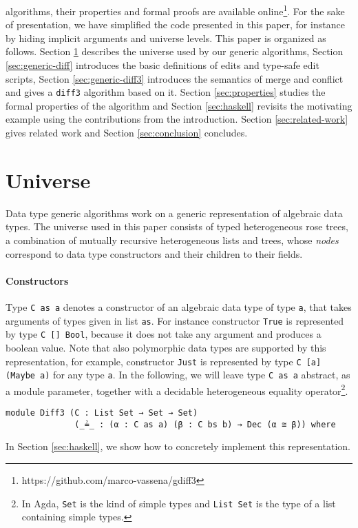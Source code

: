 \documentclass{sigplanconf}
\theoremstyle{plain}
\begin{document}
algorithms, their properties and formal proofs are available
online\footnote{https://github.com/marco-vassena/gdiff3}.  For the
sake of presentation, we have simplified the code presented in this
paper, for instance by hiding implicit arguments and universe levels.
%
This paper is organized as follows.
%
Section \ref{section:universe} describes the universe used by our
generic algorithms, Section \ref{sec:generic-diff} introduces the
basic definitions of edits and type-safe edit scripts, Section
\ref{sec:generic-diff3} introduces the semantics of merge and conflict
and gives a \texttt{diff3} algorithm based on it. Section
\ref{sec:properties} studies the formal properties of the algorithm
and Section \ref{sec:haskell} revisits the motivating example using
the contributions from the introduction.  Section
\ref{sec:related-work} gives related work and Section
\ref{sec:conclusion} concludes.

\section{Universe}
\label{section:universe}
Data type generic algorithms work on a generic representation of
algebraic data types.
%
The universe used in this paper consists of typed heterogeneous rose
trees, a combination of mutually recursive heterogeneous lists and
trees, whose \emph{nodes} correspond to data type constructors and
their children to their fields.

\paragraph{Constructors}
Type \texttt{C as a} denotes a constructor of an algebraic data type
of type \texttt{a}, that takes arguments of types given in list
\texttt{as}.
%
For instance constructor \texttt{True} is represented by type \texttt{C []
  Bool}, because it does not take any argument and produces a boolean
value.
%
Note that also polymorphic data types are supported by this
representation, for example, constructor \texttt{Just} is represented
by type \texttt{C [a] (Maybe a)} for any type \texttt{a}.
%
In the following, we will leave type \texttt{C as a} abstract, as a
module parameter, together with a decidable heterogeneous equality
operator\footnote{In Agda, \texttt{Set} is the kind of simple types
  and \texttt{List Set} is the type of a list containing simple
  types.}.

\begin{verbatim}
module Diff3 (C : List Set → Set → Set) 
              (_≟_ : (α : C as a) (β : C bs b) → Dec (α ≅ β)) where
\end{verbatim}
In Section \ref{sec:haskell}, we show how to concretely implement this
representation.
\end{document}
